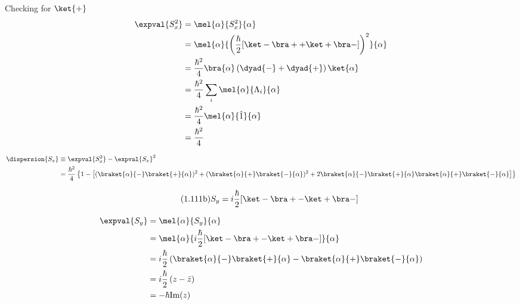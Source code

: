 \begin{answer}
\begin{answerpart}{Checking for \texorpdfstring{$\ket{+}$}{|+>}}
    \begin{equation}
      \begin{split}
        \expval{S_x^2}
        &= \mel{\alpha}{S_x^2}{\alpha}\\
        &= \mel{\alpha}{\left(\frac{\hbar}{2} [\ket - \bra + + \ket + \bra - ]\right)^2}{\alpha}\\
        &=
        \frac{\hbar^2}{4}
        \bra{\alpha}
        \left(
        \dyad{-} + \dyad{+}
        \right)
        \ket{\alpha}
        \\
        &=
        \frac{\hbar^2}{4}
        \sum_i \mel{\alpha}{\Lambda_i}{\alpha}
        \\
        &=
        \frac{\hbar^2}{4}\mel{\alpha}{\hat{1}}{\alpha}
        \\
        &=
        \frac{\hbar^2}{4}
        \\
      \end{split}
    \end{equation}

    \begin{equation}
      \begin{split}
        \dispersion{S_x}
        &\equiv \expval{S_x^2} - \expval{S_x}^2\\
        &= \frac{\hbar^2}{4}\left\{1 - \left[
        (\braket{\alpha}{-}\braket{+}{\alpha})^2
        + (\braket{\alpha}{+}\braket{-}{\alpha})^2
        + 2
        \braket{\alpha}{-}\braket{+}{\alpha}
        \braket{\alpha}{+}\braket{-}{\alpha}
        \right]
        \right\}
        \\
      \end{split}
    \end{equation}

    \begin{equation}
      \tag{1.111b}
      S_y = i \frac{\hbar}{2} [\ket - \bra + - \ket + \bra - ]
    \end{equation}

    \begin{equation}
      \begin{split}
        \expval{S_y}
        &= \mel{\alpha}{S_y}{\alpha}\\
        &= \mel{\alpha}{i \frac{\hbar}{2} [\ket - \bra + - \ket + \bra - ]}{\alpha}\\
        &=
        i\frac{\hbar}{2}
        \left(
        \braket{\alpha}{-}
        \braket{+}{\alpha}
        -
        \braket{\alpha}{+}
        \braket{-}{\alpha}
        \right)\\
        &=
        i\frac{\hbar}{2}
        \left(
        z
        -
        \bar{z}
        \right)\\
        &= -\hbar\text{Im}(z)\\
      \end{split}
    \end{equation}
    

\end{answerpart}
\end{answer}
